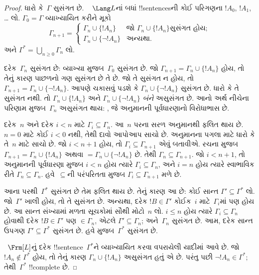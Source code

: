\documentclass[../../../include/open-logic-section]{subfiles}
\begin{document}
\begin{proof}
ધારો કે~$\Gamma$ સુસંગત છે. ~ $\Lang L$નાં બધાં !!{sentence}sની
કોઈ પરિગણના $!A_0$, $!A_1$, \dots{} લો. $\Gamma_0=\Gamma$ વ્યાખ્યાયિત
કરીને મૂકો
\[
\Gamma_{n+1} =
\begin{cases}
\Gamma_n \cup \{ !A_n \} & \textrm{જો $\Gamma_n \cup \{!A_n\}$
  સુસંગત હોય;} \\
\Gamma_n \cup \{ \lnot !A_n \} & \textrm{અન્યથા.}
\end{cases}
\]
અને $\Gamma^*=\bigcup_{n\geq 0}\Gamma_n$ લો.

દરેક~$\Gamma_n$ સુસંગત છે: વ્યાખ્યા મુજબ~$\Gamma_0$ સુસંગત છે. જો
$\Gamma_{n+1}=\Gamma_n\cup\{!A_n\}$ હોય, તો તેનું કારણ પાછળનો ગણ
સુસંગત છે તે છે. જો તે સુસંગત ન હોય, તો
$\Gamma_{n+1}=\Gamma_n\cup\{\lnot !A_n\}$. આપણે ચકાસવું પડશે કે
$\Gamma_n\cup\{\lnot !A_n\}$ સુસંગત છે. ધારો કે તે સુસંગત નથી. તો
$\Gamma_n\cup\{!A_n\}$ અને $\Gamma_n\cup\{\lnot !A_n\}$ \emph{બંને}
અસુસંગત છે. આનો અર્થ નીચેના પરિણામ મુજબ~$\Gamma_n$ અસુસંગત થાય:
,
જે અનુમાનની પૂર્વધારણાનો વિરોધાભાસ છે.

દરેક~$n$ અને દરેક $i<n$ માટે $\Gamma_i\subseteq\Gamma_n$. આ~$n$ પરના
સરળ અનુમાનથી ફલિત થાય છે. $n=0$ માટે કોઈ $i<0$ નથી, તેથી દાવો આપોઆપ
સાચો છે. અનુમાનના પગલા માટે ધારો કે તે~$n$ માટે સાચો છે. જો $i<n+1$
હોય, તો $\Gamma_i\subseteq\Gamma_{n+1}$ એવું બતાવીએ. રચના મુજબ
$\Gamma_{n+1}=\Gamma_n\cup\{!A_n\}$ અથવા
$=\Gamma_n\cup\{\lnot !A_n\}$ છે. તેથી
$\Gamma_n\subseteq\Gamma_{n+1}$. જો $i<n+1$, તો અનુમાનની પૂર્વધારણા
મુજબ $i<n$ હોય ત્યારે $\Gamma_i\subseteq\Gamma_n$, અને $i=n$ હોય
ત્યારે સ્વાભાવિક રીતે $\Gamma_n\subseteq\Gamma_n$. હવે~$\subseteq$ની
પરંપરિતતા મુજબ $\Gamma_i\subseteq\Gamma_{n+1}$ મળે છે.

આના પરથી~$\Gamma^*$ સુસંગત છે તેમ ફલિત થાય છે. તેનું કારણ આ છે:
કોઈ સાન્ત $\Gamma'\subseteq\Gamma^*$ લો. જો~$\Gamma'$ ખાલી હોય, તો તે
સુસંગત છે. અન્યથા, દરેક $!B\in\Gamma'$ કોઈક~$i$ માટે~$\Gamma_i$માં
પણ હોય છે. આ સાન્ત સંખ્યામાં મળતા સૂચકોમાં સૌથી મોટો~$n$ લો. $i\le n$ હોય ત્યારે
$\Gamma_i\subseteq\Gamma_n$ હોવાથી દરેક $!B\in\Gamma'$ પણ
$\in\Gamma_n$, એટલે $\Gamma'\subseteq\Gamma_n$; અને~$\Gamma_n$
સુસંગત છે. આમ, દરેક સાન્ત ઉપગણ $\Gamma'\subseteq\Gamma^*$ સુસંગત છે. હવે
 મુજબ~$\Gamma^*$ સુસંગત
છે.



~$\Frm[L]$નું દરેક !!{sentence}~$\Gamma^*$ને વ્યાખ્યાયિત કરવા વપરાયેલી
યાદીમાં આવે છે. જો $!A_n\notin\Gamma^*$ હોય, તો તેનું કારણ
$\Gamma_n\cup\{!A_n\}$ અસુસંગત હતું એ છે. પરંતુ પછી $\lnot !A_n\in
\Gamma^*$; તેથી~$\Gamma^*$ !!{complete} છે.
\end{proof}
\end{document}
